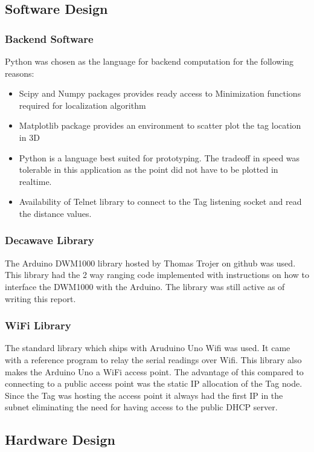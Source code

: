 \documentclass[journal,transmag]{IEEEtran}
\begin{document}
\subsection{Software Design}

\subsubsection{Backend Software}
Python was chosen as the language for backend computation for the following reasons:
\begin{itemize}
    \item Scipy and Numpy packages provides ready access to Minimization functions required for localization algorithm
    \item Matplotlib package provides an environment to scatter plot the tag location in 3D
    \item Python is a language best suited for prototyping. The tradeoff in speed was tolerable in this application as the point did not have to be plotted in realtime.
    \item Availability of Telnet library to connect to the Tag listening socket and read the distance values.
\end{itemize}
\subsubsection{Decawave Library}
The Arduino DWM1000 library hosted by Thomas Trojer on github was used\cite{thotro:2017}. This library had the 2 way ranging code implemented with instructions on how to interface the DWM1000 with the Arduino. The library was still active as of writing this report.

\subsubsection{WiFi Library}
The standard library which ships with Aruduino Uno Wifi was used. It came with a reference program to relay the serial readings over Wifi. This library also makes the Arduino Uno a WiFi access point. The advantage of this compared to connecting to a public access point was the static IP allocation of the Tag node. Since the Tag was hosting the access point it always had the first IP in the subnet eliminating the need for having access to the public DHCP server.

\subsection{Hardware Design}
\end{document}
